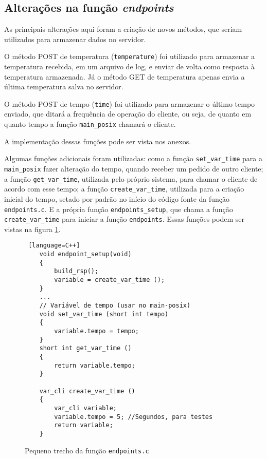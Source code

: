 \hfill \break
\hfill \break
\hfill \break
\hfill \break
\hfill \break
\hfill \break

\subsection{Alterações na função \textit{endpoints}}

As principais alterações aqui foram a criação de novos métodos, que seriam utilizados para armazenar dados no servidor.

O método POST de temperatura (\texttt{temperature}) foi utilizado para armazenar a temperatura recebida, em um arquivo de log, e enviar de volta como resposta à temperatura armazenada. Já o método GET de temperatura apenas envia a última temperatura salva no servidor.

O método POST de tempo (\texttt{time}) foi utilizado para armazenar o último tempo enviado, que ditará a frequência de operação do cliente, ou seja, de quanto em quanto tempo a função \texttt{main\_posix} chamará o cliente.

A implementação dessas funções pode ser vista nos anexos.

Algumas funções adicionais foram utilizadas: como a função \texttt{set\_var\_time} para a \texttt{main\_posix} fazer alteração do tempo, quando receber um pedido de outro cliente; a função \texttt{get\_var\_time}, utilizada pelo próprio sistema, para chamar o cliente de acordo com esse tempo; a função \texttt{create\_var\_time}, utilizada para a criação inicial do tempo, setado por padrão no início do código fonte da função \texttt{endpoints.c}. E a própria função \texttt{endpoints\_setup}, que chama a função \texttt{create\_var\_time} para iniciar a função \texttt{endpoints}. Essas funções podem ser vistas na figura \ref{code:endpoints.c}.

\begin{figure}[t]
	\begin{lstlisting} [language=C++]
	void endpoint_setup(void)
	{
		build_rsp();
		variable = create_var_time ();
	}
	...	
	// Variável de tempo (usar no main-posix)
	void set_var_time (short int tempo)
	{
		variable.tempo = tempo;
	}
	short int get_var_time ()
	{
		return variable.tempo;
	}
	
	var_cli create_var_time ()
	{
		var_cli variable;
		variable.tempo = 5; //Segundos, para testes
		return variable;
	}
	\end{lstlisting}
	\caption{Pequeno trecho da função \texttt{endpoints.c}}
	\label{code:endpoints.c}
\end{figure}
